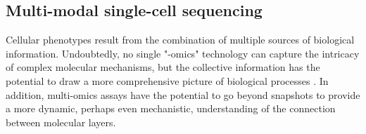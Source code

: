 \subsection{Multi-modal single-cell sequencing} \label{section:single_cell_multi_modal}

Cellular phenotypes result from the combination of multiple sources of biological information. Undoubtedly, no single "-omics" technology can capture the intricacy of complex molecular mechanisms, but the collective information has the potential to draw a more comprehensive picture of biological processes \cite{Hasin2017,Ritchie2015}. In addition, multi-omics assays have the potential to go beyond snapshots to provide a more dynamic, perhaps even mechanistic, understanding of the connection between molecular layers.




